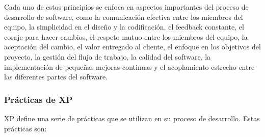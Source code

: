 \documentclass[executivepaper]{article}
\begin{document}
Cada uno de estos principios se enfoca en aspectos importantes del proceso de desarrollo de software, como la comunicación efectiva entre los miembros del equipo, la simplicidad en el diseño y la codificación, el feedback constante, el coraje para hacer cambios, el respeto mutuo entre los miembros del equipo, la aceptación del cambio, el valor entregado al cliente, el enfoque en los objetivos del proyecto, la gestión del flujo de trabajo, la calidad del software, la implementación de pequeñas mejoras continuas y el acoplamiento estrecho entre las diferentes partes del software.

\subsubsection*{Prácticas de XP}

XP define una serie de prácticas que se utilizan en su proceso de desarrollo. Estas prácticas son:
\end{document}
